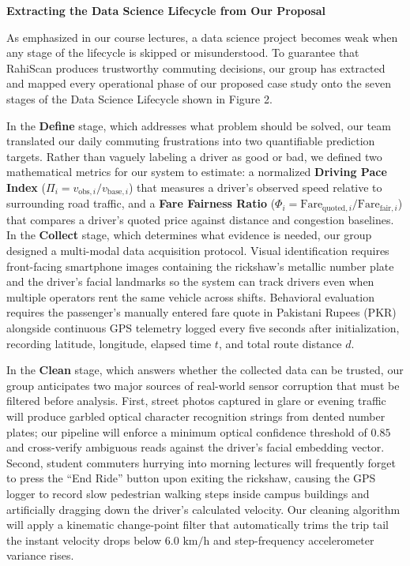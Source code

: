 \documentclass[12pt, a4paper]{article}
\newcommand{\subheading}[1]{%
  \vspace{8pt}%
  {\noindent\fontsize{14pt}{18pt}\selectfont\bfseries\color{slate}#1\par}%
  \vspace{4pt}%
}
\begin{document}
\subheading{Extracting the Data Science Lifecycle from Our Proposal}

As emphasized in our course lectures, a data science project becomes weak when any stage of the lifecycle is skipped or misunderstood. To guarantee that RahiScan produces trustworthy commuting decisions, our group has extracted and mapped every operational phase of our proposed case study onto the seven stages of the Data Science Lifecycle shown in Figure 2.

In the \textbf{Define} stage, which addresses what problem should be solved, our team translated our daily commuting frustrations into two quantifiable prediction targets. Rather than vaguely labeling a driver as good or bad, we defined two mathematical metrics for our system to estimate: a normalized \textbf{Driving Pace Index} ($\Pi_i = v_{\text{obs},i} / v_{\text{base},i}$) that measures a driver's observed speed relative to surrounding road traffic, and a \textbf{Fare Fairness Ratio} ($\Phi_i = \text{Fare}_{\text{quoted},i} / \text{Fare}_{\text{fair},i}$) that compares a driver's quoted price against distance and congestion baselines. In the \textbf{Collect} stage, which determines what evidence is needed, our group designed a multi-modal data acquisition protocol. Visual identification requires front-facing smartphone images containing the rickshaw's metallic number plate and the driver's facial landmarks so the system can track drivers even when multiple operators rent the same vehicle across shifts. Behavioral evaluation requires the passenger's manually entered fare quote in Pakistani Rupees ($\text{PKR}$) alongside continuous GPS telemetry logged every five seconds after initialization, recording latitude, longitude, elapsed time $t$, and total route distance $d$.

In the \textbf{Clean} stage, which answers whether the collected data can be trusted, our group anticipates two major sources of real-world sensor corruption that must be filtered before analysis. First, street photos captured in glare or evening traffic will produce garbled optical character recognition strings from dented number plates; our pipeline will enforce a minimum optical confidence threshold of $0.85$ and cross-verify ambiguous reads against the driver's facial embedding vector. Second, student commuters hurrying into morning lectures will frequently forget to press the ``End Ride'' button upon exiting the rickshaw, causing the GPS logger to record slow pedestrian walking steps inside campus buildings and artificially dragging down the driver's calculated velocity. Our cleaning algorithm will apply a kinematic change-point filter that automatically trims the trip tail the instant velocity drops below $6.0\text{ km/h}$ and step-frequency accelerometer variance rises.
\end{document}

